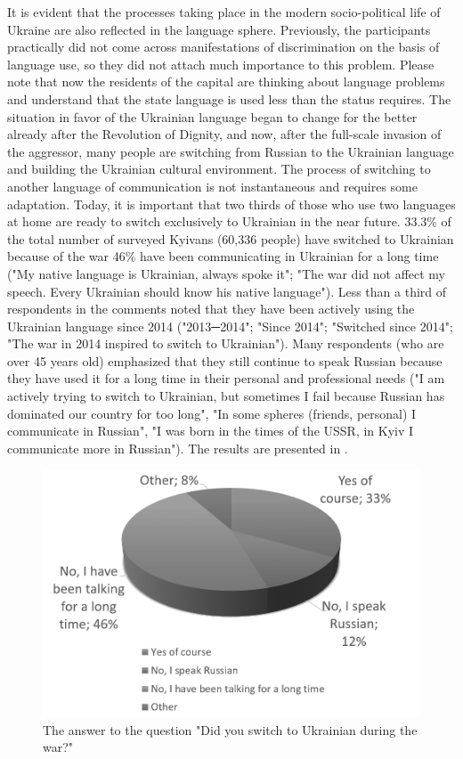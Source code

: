 \documentclass[english]{textolivre}
\begin{document}
It is evident that the processes taking place in the modern socio-political life of Ukraine are also reflected in the language sphere. Previously, the participants practically did not come across manifestations of discrimination on the basis of language use, so they did not attach much importance to this problem. Please note that now the residents of the capital are thinking about language problems and understand that the state language is used less than the status requires. The situation in favor of the Ukrainian language began to change for the better already after the Revolution of Dignity, and now, after the full-scale invasion of the aggressor, many people are switching from Russian to the Ukrainian language and building the Ukrainian cultural environment. The process of switching to another language of communication is not instantaneous and requires some adaptation. Today, it is important that two thirds of those who use two languages at home are ready to switch exclusively to Ukrainian in the near future. 33.3\% of the total number of surveyed Kyivans (60,336 people) have switched to Ukrainian because of the war 46\% have been communicating in Ukrainian for a long time ("My native language is Ukrainian, always spoke it"; "The war did not affect my speech. Every Ukrainian should know his native language"). Less than a third of respondents in the comments noted that they have been actively using the Ukrainian language since 2014 ("2013─2014"; "Since 2014"; "Switched since 2014"; "The war in 2014 inspired to switch to Ukrainian"). Many respondents (who are over 45 years old) emphasized that they still continue to speak Russian because they have used it for a long time in their personal and professional needs ("I am actively trying to switch to Ukrainian, but sometimes I fail because Russian has dominated our country for too long", "In some spheres (friends, personal) I communicate in Russian", "I was born in the times of the USSR, in Kyiv I communicate more in Russian"). The results are presented in .

\begin{figure}[h!]
\centering
\begin{minipage}{.7\textwidth}
 \includegraphics[width=\textwidth]{Fig6.png}
 \caption{The answer to the question "Did you switch to Ukrainian during the war?"}
 \label{fig6}
\end{minipage}
\end{figure}
\end{document}
